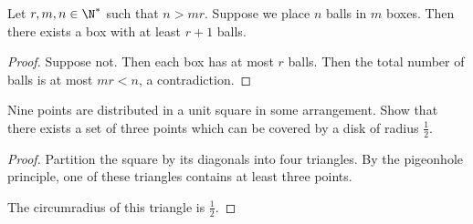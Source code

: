 \begin{theorem*} \label{thm:php:generalised}
    Let $r, m, n \in \N^*$ such that $n > mr$.
    Suppose we place $n$ balls in $m$ boxes.
    Then there exists a box with at least $r+1$ balls.
\end{theorem*}
\begin{proof}
    Suppose not.
    Then each box has at most $r$ balls.
    Then the total number of balls is at most $mr < n$, a contradiction.
\end{proof}

\begin{example}
    Nine points are distributed in a unit square in some arrangement.
    Show that there exists a set of three points which can be covered by a
    disk of radius $\frac12$.
\end{example}
\begin{proof}
    Partition the square by its diagonals into four triangles.
    By the pigeonhole principle, one of these triangles contains at least
    three points.
    \begin{center}
    \end{center}
    The circumradius of this triangle is $\frac12$.
\end{proof}

